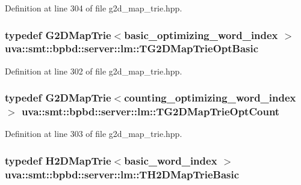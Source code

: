 Definition at line 304 of file g2d\+\_\+map\+\_\+trie.\+hpp.

\hypertarget{namespaceuva_1_1smt_1_1bpbd_1_1server_1_1lm_a7e7e59c4bbfb156cb0d74a38a0cd7acf}{}
\subsubsection[{T\+G2\+D\+Map\+Trie\+Opt\+Basic}]{\setlength{\rightskip}{0pt plus 5cm}typedef {\bf G2\+D\+Map\+Trie}$<${\bf basic\+\_\+optimizing\+\_\+word\+\_\+index} $>$ {\bf uva\+::smt\+::bpbd\+::server\+::lm\+::\+T\+G2\+D\+Map\+Trie\+Opt\+Basic}}\label{namespaceuva_1_1smt_1_1bpbd_1_1server_1_1lm_a7e7e59c4bbfb156cb0d74a38a0cd7acf}


Definition at line 302 of file g2d\+\_\+map\+\_\+trie.\+hpp.

\hypertarget{namespaceuva_1_1smt_1_1bpbd_1_1server_1_1lm_a4bb2485b784ec0eeb9700beaacee3b67}{}
\subsubsection[{T\+G2\+D\+Map\+Trie\+Opt\+Count}]{\setlength{\rightskip}{0pt plus 5cm}typedef {\bf G2\+D\+Map\+Trie}$<${\bf counting\+\_\+optimizing\+\_\+word\+\_\+index} $>$ {\bf uva\+::smt\+::bpbd\+::server\+::lm\+::\+T\+G2\+D\+Map\+Trie\+Opt\+Count}}\label{namespaceuva_1_1smt_1_1bpbd_1_1server_1_1lm_a4bb2485b784ec0eeb9700beaacee3b67}


Definition at line 303 of file g2d\+\_\+map\+\_\+trie.\+hpp.

\hypertarget{namespaceuva_1_1smt_1_1bpbd_1_1server_1_1lm_a9c09db165d8f78b5bd1ed3925f7cdf37}{}
\subsubsection[{T\+H2\+D\+Map\+Trie\+Basic}]{\setlength{\rightskip}{0pt plus 5cm}typedef {\bf H2\+D\+Map\+Trie}$<${\bf basic\+\_\+word\+\_\+index} $>$ {\bf uva\+::smt\+::bpbd\+::server\+::lm\+::\+T\+H2\+D\+Map\+Trie\+Basic}}\label{namespaceuva_1_1smt_1_1bpbd_1_1server_1_1lm_a9c09db165d8f78b5bd1ed3925f7cdf37}


